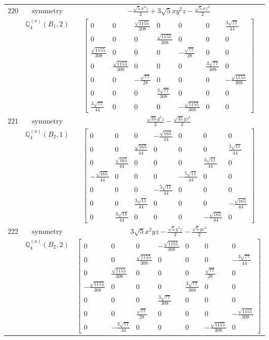 \documentclass[fleqn,8pt,landscape]{jsarticle}
\begin{document}
\begin{longtable}{ccc}
$ 220 $ & $ \text{symmetry} $ & $ - \frac{\sqrt{5} x^{3} z}{2} + 3 \sqrt{5} x y^{2} z - \frac{\sqrt{5} x z^{3}}{2} $ \\
$  $ & $ \mathbb{Q}_{4}^{(a)}(B_{1},2) $ & $ \begin{bmatrix} 0 & 0 & \frac{\sqrt{1155}}{308} & 0 & 0 & 0 & \frac{3 \sqrt{77}}{44} \\ 0 & 0 & 0 & \frac{\sqrt{1155}}{308} & 0 & 0 & 0 \\ \frac{\sqrt{1155}}{308} & 0 & 0 & 0 & - \frac{\sqrt{77}}{28} & 0 & 0 \\ 0 & \frac{\sqrt{1155}}{308} & 0 & 0 & 0 & \frac{3 \sqrt{77}}{308} & 0 \\ 0 & 0 & - \frac{\sqrt{77}}{28} & 0 & 0 & 0 & - \frac{\sqrt{1155}}{308} \\ 0 & 0 & 0 & \frac{3 \sqrt{77}}{308} & 0 & 0 & 0 \\ \frac{3 \sqrt{77}}{44} & 0 & 0 & 0 & - \frac{\sqrt{1155}}{308} & 0 & 0 \end{bmatrix} $ \\ \hline
$ 221 $ & $ \text{symmetry} $ & $ \frac{\sqrt{35} y^{3} z}{2} - \frac{\sqrt{35} y z^{3}}{2} $ \\
$  $ & $ \mathbb{Q}_{4}^{(a)}(B_{2},1) $ & $ \begin{bmatrix} 0 & 0 & 0 & - \frac{\sqrt{165}}{44} & 0 & 0 & 0 \\ 0 & 0 & \frac{\sqrt{165}}{44} & 0 & 0 & 0 & \frac{3 \sqrt{11}}{44} \\ 0 & \frac{\sqrt{165}}{44} & 0 & 0 & 0 & \frac{3 \sqrt{11}}{44} & 0 \\ - \frac{\sqrt{165}}{44} & 0 & 0 & 0 & - \frac{5 \sqrt{11}}{44} & 0 & 0 \\ 0 & 0 & 0 & - \frac{5 \sqrt{11}}{44} & 0 & 0 & 0 \\ 0 & 0 & \frac{3 \sqrt{11}}{44} & 0 & 0 & 0 & - \frac{\sqrt{165}}{44} \\ 0 & \frac{3 \sqrt{11}}{44} & 0 & 0 & 0 & - \frac{\sqrt{165}}{44} & 0 \end{bmatrix} $ \\ \hline
$ 222 $ & $ \text{symmetry} $ & $ 3 \sqrt{5} x^{2} y z - \frac{\sqrt{5} y^{3} z}{2} - \frac{\sqrt{5} y z^{3}}{2} $ \\
$  $ & $ \mathbb{Q}_{4}^{(a)}(B_{2},2) $ & $ \begin{bmatrix} 0 & 0 & 0 & - \frac{\sqrt{1155}}{308} & 0 & 0 & 0 \\ 0 & 0 & \frac{\sqrt{1155}}{308} & 0 & 0 & 0 & - \frac{3 \sqrt{77}}{44} \\ 0 & \frac{\sqrt{1155}}{308} & 0 & 0 & 0 & \frac{\sqrt{77}}{28} & 0 \\ - \frac{\sqrt{1155}}{308} & 0 & 0 & 0 & \frac{3 \sqrt{77}}{308} & 0 & 0 \\ 0 & 0 & 0 & \frac{3 \sqrt{77}}{308} & 0 & 0 & 0 \\ 0 & 0 & \frac{\sqrt{77}}{28} & 0 & 0 & 0 & - \frac{\sqrt{1155}}{308} \\ 0 & - \frac{3 \sqrt{77}}{44} & 0 & 0 & 0 & - \frac{\sqrt{1155}}{308} & 0 \end{bmatrix} $ \\ \hline

\end{longtable}
\end{document}
